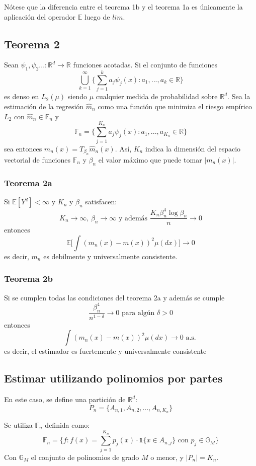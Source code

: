 \documentclass[12pt, a4paper]{article}
\begin{document}
Nótese que la diferencia entre el teorema 1b y el teorema 1a es únicamente la aplicación del operador 
$\mathds{E}$ luego de $lim$.

\subsection{Teorema 2}
Sean $\psi_1, \psi_2... :\mathds{R}^d\rightarrow\mathds{R}$ funciones acotadas. Si el conjunto de funciones
$$
\bigcup_{k=1}^{\infty}
\Bigg\{
\sum_{j=1}^k a_j\psi_j(x):a_1,...,a_k \in \mathds{R}  
\Bigg\}
$$
es denso en $L_2(\mu)$ siendo $\mu$ cualquier medida de probabilidad sobre $\mathds{R}^d$. Sea la estimación de la regresión $\hat{m}_n$ como una función que minimiza el riesgo empírico $L_2$ con $\hat{m}_n \in \mathds{F}_n$ y 
$$
\mathds{F}_n = \Bigg\{ \sum_{j=1}^{K_n} a_j\psi_j(x):a_1, ..., a_{K_n} \in \mathds{R}\Bigg\}
$$
sea entonces $m_n(x)=T_{\beta_n} \hat{m}_n(x)$.
Así, $K_n$ indica la dimensión del espacio vectorial de funciones $\mathds{F}_n$ y $\beta_n$ el valor máximo que puede tomar $|m_n(x)|$.
\subsubsection{Teorema 2a}
Si $\mathds{E}[Y^2]<\infty$ y $K_n$ y $\beta_n$ satisfacen:
$$
K_n\rightarrow\infty
\text{, }
\beta_n\rightarrow\infty
\text{ y además }
\frac{ K_n \beta_n^4 \mathop{log} \beta_n }{n}\rightarrow 0
$$
entonces
$$
\mathds{E}
\Bigg[ 
\int 
(m_n(x)-m(x))^2
\mu(dx)
\Bigg]
\rightarrow 0
$$
es decir, $m_n$ es debilmente y universalmente consistente.
\subsubsection{Teorema 2b}
Si se cumplen todas las condiciones del teorema 2a y además se cumple
$$
\frac{\beta_n^4}{n^{1-\delta}}\rightarrow 0 \text{ para algún $\delta>0$}
$$
entonces
$$
\int (m_n(x)-m(x))^2 \mu(dx) \rightarrow 0 \text{ a.s. }
$$
es decir, el estimador es fuertemente y universalmente consistente
\subsection{Estimar utilizando polinomios por partes}
En este caso, se define una partición de $\mathds{R}^d$:
$$
P_n=\{ A_{n,1}, A_{n,2}, ..., A_{n,K_n} \}
$$

Se utiliza $\mathds{F}_n$ definida como:
$$
\mathds{F}_n
=
\Bigg\{
  f:f(x)
  =
  \sum_{j=1}^{K_n} 
    p_j(x) 
    \cdot 
    \mathds{1}\{x \in A_{n,j}\}  
  \text{ con }
  p_j \in \mathds{G}_M
\Bigg\}
$$
Con $\mathds{G}_M$ el conjunto de polinomios de grado $M$ o menor, y $|P_n|=K_n$.
\end{document}
